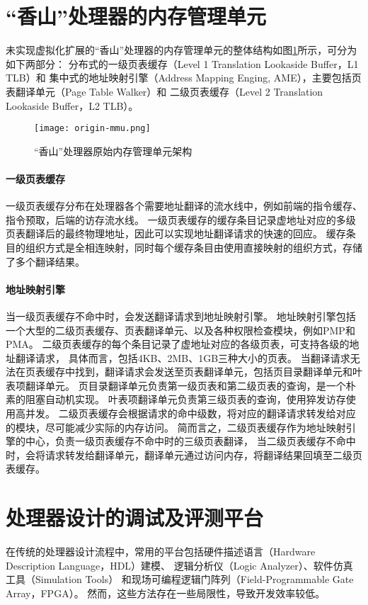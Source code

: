 \section{“香山”处理器的内存管理单元}
未实现虚拟化扩展的“香山”处理器的内存管理单元的整体结构如图\ref{fig:origin-mmu}所示，可分为如下两部分：
分布式的一级页表缓存（Level 1 Translation Lookaside Buffer，L1 TLB）和
集中式的地址映射引擎（Address Mapping Enging, AME），主要包括页表翻译单元（Page Table Walker）和
二级页表缓存（Level 2 Translation Lookaside Buffer，L2 TLB）。

\begin{figure}[htbp]
    \centering
    \texttt{[image: origin-mmu.png]}
    \caption{“香山”处理器原始内存管理单元架构}
    \label{fig:origin-mmu}
\end{figure}

\paragraph{一级页表缓存} 一级页表缓存分布在处理器各个需要地址翻译的流水线中，例如前端的指令缓存、指令预取，后端的访存流水线。
一级页表缓存的缓存条目记录虚地址对应的多级页表翻译后的最终物理地址，因此可以实现地址翻译请求的快速的回应。
缓存条目的组织方式是全相连映射，同时每个缓存条目由使用直接映射的组织方式，存储了多个翻译结果。

\paragraph{地址映射引擎} 当一级页表缓存不命中时，会发送翻译请求到地址映射引擎。
地址映射引擎包括一个大型的二级页表缓存、页表翻译单元、以及各种权限检查模块，例如PMP和PMA。
二级页表缓存的每个条目记录了虚地址对应的各级页表，可支持各级的地址翻译请求，
具体而言，包括4KB、2MB、1GB三种大小的页表。
当翻译请求无法在页表缓存中找到，翻译请求会发送至页表翻译单元，包括页目录翻译单元和叶表项翻译单元。
页目录翻译单元负责第一级页表和第二级页表的查询，是一个朴素的阻塞自动机实现。
叶表项翻译单元负责第三级页表的查询，使用猝发访存使用高并发。
二级页表缓存会根据请求的命中级数，将对应的翻译请求转发给对应的模块，尽可能减少实际的内存访问。
简而言之，二级页表缓存作为地址映射引擎的中心，负责一级页表缓存不命中时的三级页表翻译，
当二级页表缓存不命中时，会将请求转发给翻译单元，翻译单元通过访问内存，将翻译结果回填至二级页表缓存。

\section{处理器设计的调试及评测平台}
在传统的处理器设计流程中，常用的平台包括硬件描述语言（Hardware Description Language，HDL）建模、
逻辑分析仪（Logic Analyzer）、软件仿真工具（Simulation Tools）
和现场可编程逻辑门阵列（Field-Programmable Gate Array，FPGA）。
然而，这些方法存在一些局限性，导致开发效率较低。

